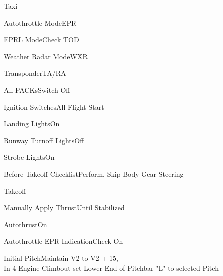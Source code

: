 \documentclass[sim-use]{checklist}
\begin{document}
\begin{checklist}{Taxi}
	 {
		\item{Autothrottle Mode}{EPR}
		\item{EPRL Mode}{Check TOD}
		\item{Weather Radar Mode}{WXR}
		\item{Transponder}{TA/RA}
	}
	 {
		\item{All PACKs}{Switch Off}
		\item{Ignition Switches}{All Flight Start}
		\item{Landing Lights}{On}
		\item{Runway Turnoff Lights}{Off}
		\item{Strobe Lights}{On}
		\item{Before Takeoff Checklist}{Perform, Skip Body Gear Steering}
	}
\end{checklist}

\begin{checklist}{Takeoff}
	\item{Manually Apply Thrust}{Until Stabilized}
	\item{Autothrust}{On}
	\item{Autothrottle EPR Indication}{Check On}
	\item{Initial Pitch}{Maintain V2 to V2 + 15,\\In 4-Engine Climbout set Lower End of Pitchbar "L" to selected Pitch}
\end{checklist}
\end{document}

